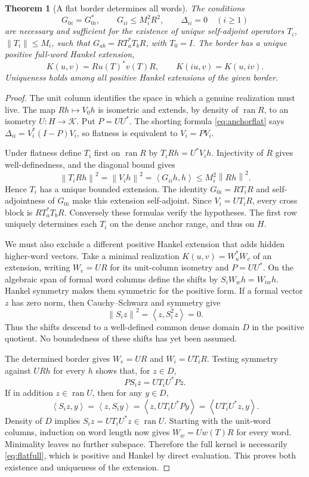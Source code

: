 \documentclass[11pt,a4paper]{amsart}
\numberwithin{equation}{section}
\newtheorem{theorem}{Theorem}[section]
\theoremstyle{definition}
\theoremstyle{remark}
\DeclareMathOperator{\ran}{ran}
\newcommand{\norm}[1]{\left\lVert#1\right\rVert}
\newcommand{\ip}[2]{\left\langle#1,#2\right\rangle}
\begin{document}
\begin{theorem}[A flat border determines all words]\label{thm:flatborder}
The conditions
\[
 G_{0i}=G_{0i}^*,\qquad G_{ii}\le M_i^2R^2,\qquad \Delta_{ii}=0
 \quad(i\ge1)
\]
are necessary and sufficient for the existence of unique self-adjoint operators $T_i$, $\norm{T_i}\le M_i$, such that
$G_{ab}=RT_a^*T_bR$, with $T_0=I$.
The border has a unique positive full-word Hankel extension,
\begin{equation}\label{eq:flatfull}
 K(u,v)=Ru(T)^*v(T)R,\qquad K(iu,v)=K(u,iv).
\end{equation}
Uniqueness holds among all positive Hankel extensions of the given border.
\end{theorem}
\begin{proof}
The unit column identifies the space in which a genuine realization must live. The map $Rh\mapsto V_0h$ is isometric and extends, by density of $\ran R$, to an isometry $U:H\to\mathcal K$. Put $P=UU^*$. The shorting formula \eqref{eq:anchorflat} says $\Delta_{ii}=V_i^*(I-P)V_i$, so flatness is equivalent to $V_i=PV_i$.

Under flatness define $T_i$ first on $\ran R$ by $T_iRh=U^*V_ih$. Injectivity of $R$ gives well-definedness, and the diagonal bound gives
\[
 \norm{T_iRh}^2=\norm{V_ih}^2
 =\ip{G_{ii}h}h\le M_i^2\norm{Rh}^2.
\]
Hence $T_i$ has a unique bounded extension. The identity $G_{0i}=RT_iR$ and self-adjointness of $G_{0i}$ make this extension self-adjoint. Since $V_i=UT_iR$, every cross block is $RT_a^*T_bR$. Conversely these formulas verify the hypotheses. The first row uniquely determines each $T_i$ on the dense anchor range, and thus on $H$.

We must also exclude a different positive Hankel extension that adds hidden higher-word vectors. Take a minimal realization $K(u,v)=W_u^*W_v$ of an extension, writing $W_e=UR$ for its unit-column isometry and $P=UU^*$. On the algebraic span of formal word columns define the shifts by $S_iW_wh=W_{iw}h$. Hankel symmetry makes them symmetric for the positive form. If a formal vector $z$ has zero norm, then Cauchy--Schwarz and symmetry give
\[
 \norm{S_iz}^2=\ip z{S_i^2z}=0.
\]
Thus the shifts descend to a well-defined common dense domain $D$ in the positive quotient. No boundedness of these shifts has yet been assumed.

The determined border gives $W_e=UR$ and $W_i=UT_iR$. Testing symmetry against $URh$ for every $h$ shows that, for $z\in D$,
\[
 PS_iz=UT_iU^*Pz.
\]
If in addition $z\in\ran U$, then for any $y\in D$,
\[
 \ip{S_iz}y=\ip z{S_iy}
 =\ip z{UT_iU^*Py}=\ip{UT_iU^*z}y.
\]
Density of $D$ implies $S_iz=UT_iU^*z\in\ran U$. Starting with the unit-word columns, induction on word length now gives $W_w=Uw(T)R$ for every word. Minimality leaves no further subspace. Therefore the full kernel is necessarily \eqref{eq:flatfull}, which is positive and Hankel by direct evaluation. This proves both existence and uniqueness of the extension.
\end{proof}
\end{document}
